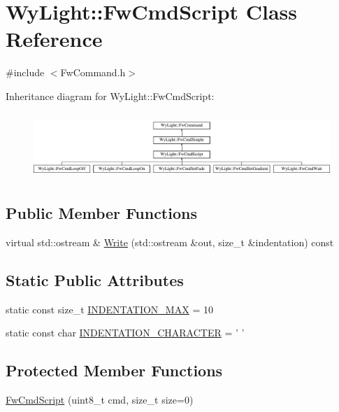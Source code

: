 \hypertarget{class_wy_light_1_1_fw_cmd_script}{\section{Wy\-Light\-:\-:Fw\-Cmd\-Script Class Reference}
\label{class_wy_light_1_1_fw_cmd_script}
}


{\ttfamily \#include $<$Fw\-Command.\-h$>$}

Inheritance diagram for Wy\-Light\-:\-:Fw\-Cmd\-Script\-:\begin{figure}[H]
\begin{center}
\leavevmode
\includegraphics[height=2.502793cm]{class_wy_light_1_1_fw_cmd_script}
\end{center}
\end{figure}
\subsection*{Public Member Functions}
\begin{DoxyCompactItemize}
\item 
virtual std\-::ostream \& \hyperlink{class_wy_light_1_1_fw_cmd_script_ad7b0c30c6787466057b109c5a5bba6b6}{Write} (std\-::ostream \&out, size\-\_\-t \&indentation) const 
\end{DoxyCompactItemize}
\subsection*{Static Public Attributes}
\begin{DoxyCompactItemize}
\item 
static const size\-\_\-t \hyperlink{class_wy_light_1_1_fw_cmd_script_ab071e02170fbedc26196dece08682379}{I\-N\-D\-E\-N\-T\-A\-T\-I\-O\-N\-\_\-\-M\-A\-X} = 10
\item 
static const char \hyperlink{class_wy_light_1_1_fw_cmd_script_a8cb5ea593860ed67f2d2a0c775f9a590}{I\-N\-D\-E\-N\-T\-A\-T\-I\-O\-N\-\_\-\-C\-H\-A\-R\-A\-C\-T\-E\-R} = ' '
\end{DoxyCompactItemize}
\subsection*{Protected Member Functions}
\begin{DoxyCompactItemize}
\item 
\hyperlink{class_wy_light_1_1_fw_cmd_script_ab536f677dfe8306d3d6c13eb15198c19}{Fw\-Cmd\-Script} (uint8\-\_\-t cmd, size\-\_\-t size=0)
\end{DoxyCompactItemize}

